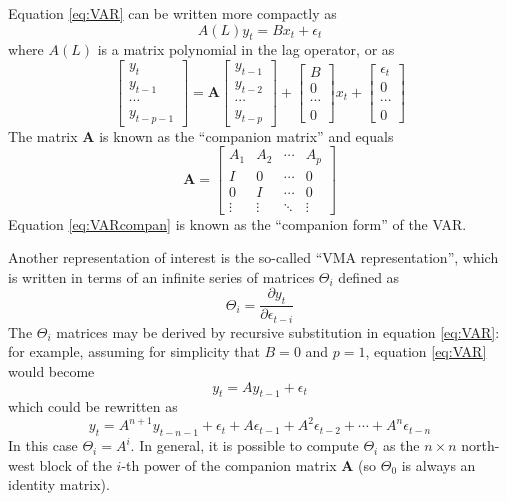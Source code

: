 Equation \eqref{eq:VAR} can be written more compactly as
\begin{equation}
  \label{eq:VARpoly}
  A(L) y_t = B x_t + \epsilon_t
\end{equation}
where $A(L)$ is a matrix polynomial in the lag operator, or as
\begin{equation}
  \label{eq:VARcompan}
  \left[\begin{array}{c} y_t \\ y_{t-1} \\ \cdots \\ y_{t-p-1} 
    \end{array} \right] = 
  \mathbf{A}
  \left[\begin{array}{c} y_{t-1} \\ y_{t-2} \\ \cdots \\ y_{t-p} 
    \end{array} \right] +
  \left[\begin{array}{c} B \\ 0 \\ \cdots \\ 0
    \end{array} \right] x_t +
  \left[\begin{array}{c} \epsilon_t \\ 0 \\ \cdots \\ 0 
    \end{array} \right]
\end{equation}
The matrix $\mathbf{A}$ is known as the ``companion matrix'' and equals
\[
\mathbf{A} =
  \left[\begin{array}{ccccc} 
      A_1 & A_2 & \cdots & A_p \\ 
      I & 0 & \cdots & 0 \\ 
      0 & I & \cdots & 0 \\ 
      \vdots & \vdots & \ddots & \vdots
    \end{array} \right]
\]
Equation \eqref{eq:VARcompan} is known as the ``companion form'' of
the VAR.

Another representation of interest is the so-called ``VMA
representation'', which is written in terms of an infinite series of
matrices $\Theta_i$ defined as
\begin{equation}
  \label{eq:VMA}
  \Theta_i = \frac{\partial y_t}{\partial \epsilon_{t-i}}
\end{equation}
The $\Theta_i$ matrices may be derived by recursive substitution in
equation \eqref{eq:VAR}: for example, assuming for simplicity that
$B=0$ and $p=1$, equation \eqref{eq:VAR} would become
\[
  y_t = A y_{t-1} + \epsilon_t
\]
which could be rewritten as
\[
  y_t = A^{n+1} y_{t-n-1} + \epsilon_t + A \epsilon_{t-1} + A^2
  \epsilon_{t-2} + \cdots + A^n \epsilon_{t-n}
\]
In this case $\Theta_i = A^i$. In general, it is possible to compute
$\Theta_i$ as the $n \times n$ north-west block of the $i$-th power of the
companion matrix $\mathbf{A}$ (so $\Theta_0$ is always an identity matrix).

